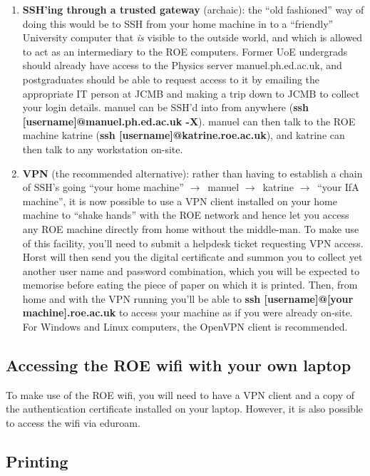\begin{enumerate}
\item {\bf SSH'ing through a trusted gateway} (archaic): the ``old fashioned'' way of doing this would be to SSH from your home machine in to a ``friendly'' University computer that \textit{is} visible to the outside world, and which is allowed to act as an intermediary to the ROE computers. Former UoE undergrads should already have access to the Physics server {\sc manuel.ph.ed.ac.uk}, and postgraduates should be able to request access to it by emailing the appropriate IT person at JCMB and making a trip down to JCMB to collect your login details. {\sc manuel} can be SSH'd into from anywhere ({\bf ssh [username]@manuel.ph.ed.ac.uk -X}). {\sc manuel} can then talk to the ROE machine {\sc katrine} ({\bf ssh [username]@katrine.roe.ac.uk}), and {\sc katrine} can then talk to any workstation on-site.
\item {\bf VPN} (the recommended alternative): rather than having to establish a chain of SSH's going ``your home machine'' $\rightarrow$\ {\sc manuel} $\rightarrow$\ {\sc katrine} $\rightarrow$\ ``your IfA machine'', it is now possible to use a VPN client installed on your home machine to ``shake hands'' with the ROE network and hence let you access any ROE machine directly from home without the middle-man. To make use of this facility, you'll need to submit a helpdesk ticket requesting VPN access. Horst will then send you the digital certificate and summon you to collect yet another user name and password combination, which you will be expected to memorise before eating the piece of paper on which it is printed. Then, from home and with the VPN running you'll be able to {\bf ssh [username]@[your machine].roe.ac.uk} to access your machine as if you were already on-site. For Windows and Linux computers, the OpenVPN client is recommended.
\end{enumerate}


\subsection{Accessing the ROE wifi with your own laptop}
To make use of the ROE wifi, you will need to have a VPN client and a copy of the authentication certificate installed on your laptop.  However, it is also possible to access the wifi via eduroam. 


\subsection{Printing}


